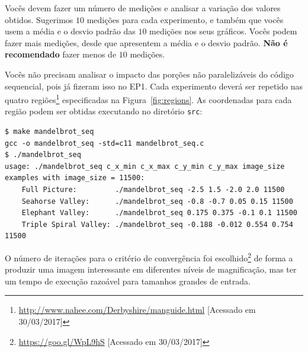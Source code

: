 \documentclass[final,12pt,a4paper]{elsarticle}
\begin{document}
Vocês devem fazer um número de medições e analisar a variação dos valores
obtidos.  Sugerimos $10$ medições para cada experimento, e também que vocês
usem a média e o desvio padrão das $10$ medições nos seus gráficos. Vocês podem
fazer mais medições, desde que apresentem a média e o desvio padrão.
\textbf{Não é recomendado} fazer menos de $10$ medições.

Vocês não precisam analisar o impacto das porções não paralelizáveis do
código sequencial, pois já fizeram isso no EP1.
Cada experimento deverá ser repetido nas quatro
regiões\footnote{\url{http://www.nahee.com/Derbyshire/manguide.html} [Acessado
em 30/03/2017]} especificadas na Figura~\ref{fig:regions}. As coordenadas para
cada região podem ser obtidas executando no diretório \texttt{src}:

\begin{lstlisting}
$ make mandelbrot_seq
gcc -o mandelbrot_seq -std=c11 mandelbrot_seq.c
$ ./mandelbrot_seq
usage: ./mandelbrot_seq c_x_min c_x_max c_y_min c_y_max image_size
examples with image_size = 11500:
    Full Picture:         ./mandelbrot_seq -2.5 1.5 -2.0 2.0 11500
    Seahorse Valley:      ./mandelbrot_seq -0.8 -0.7 0.05 0.15 11500
    Elephant Valley:      ./mandelbrot_seq 0.175 0.375 -0.1 0.1 11500
    Triple Spiral Valley: ./mandelbrot_seq -0.188 -0.012 0.554 0.754 11500
\end{lstlisting}

O número de iterações para o critério de convergência foi
escolhido\footnote{\url{https://goo.gl/WpL9hS} [Acessado em 30/03/2017]} de
forma a produzir uma imagem interessante em diferentes níveis de magnificação,
mas ter um tempo de execução razoável para tamanhos grandes de entrada.
\end{document}
